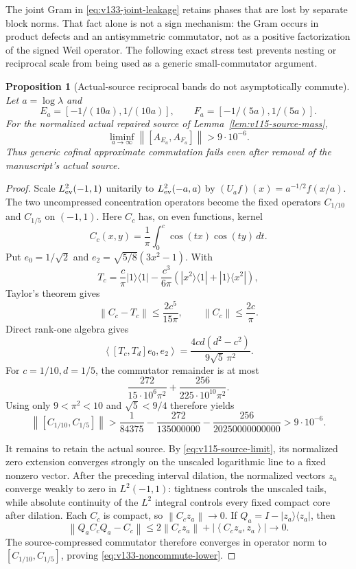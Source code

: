 \documentclass[11pt]{article}
\newtheorem{proposition}[theorem]{Proposition}
\theoremstyle{remark}
\newcommand{\norm}[1]{\left\lVert #1\right\rVert}
\newcommand{\ip}[2]{\left\langle #1,#2\right\rangle}
\begin{document}
The joint Gram in \eqref{eq:v133-joint-leakage} retains phases that are
lost by separate block norms.  That fact alone is not a sign mechanism:
the Gram occurs in product defects and an antisymmetric commutator, not
as a positive factorization of the signed Weil operator.  The following
exact stress test prevents nesting or reciprocal scale from being used
as a generic small-commutator argument.

\begin{proposition}[Actual-source reciprocal bands do not asymptotically commute]
\label{prop:v133-noncommute}
Let $a=\log\lambda$ and
\[
 E_a=[-1/(10a),1/(10a)],\qquad
 F_a=[-1/(5a),1/(5a)].
\]
For the normalized actual repaired source of
Lemma~\ref{lem:v115-source-mass},
\begin{equation}
 \liminf_{a\to\infty}
 \norm{[A_{E_a},A_{F_a}]}>9\cdot10^{-6}.
 \label{eq:v133-noncommute-lower}
\end{equation}
Thus generic cofinal approximate commutation fails even after removal of
the manuscript's actual source.
\end{proposition}
\begin{proof}
Scale $L^2_{\rm ev}(-1,1)$ unitarily to
$L^2_{\rm ev}(-a,a)$ by
$(U_af)(x)=a^{-1/2}f(x/a)$.  The two uncompressed concentration
operators become the fixed operators $C_{1/10}$ and $C_{1/5}$ on
$(-1,1)$.  Here $C_c$ has, on even functions, kernel
\[
 C_c(x,y)=\frac1\pi\int_0^c\cos(tx)\cos(ty)\,dt.
\]
Put $e_0=1/\sqrt2$ and
$e_2=\sqrt{5/8}(3x^2-1)$.  With
\[
 T_c=\frac c\pi|1\rangle\langle1|
 -\frac{c^3}{6\pi}
 (|x^2\rangle\langle1|+|1\rangle\langle x^2|),
\]
Taylor's theorem gives
\[
 \norm{C_c-T_c}\le\frac{2c^5}{15\pi},
 \qquad \norm{C_c}\le\frac{2c}{\pi}.
\]
Direct rank-one algebra gives
\[
 \ip{[T_c,T_d]e_0}{e_2}
 =\frac{4cd(d^2-c^2)}{9\sqrt5\,\pi^2}.
\]
For $c=1/10,d=1/5$, the commutator remainder is at most
\[
 \frac{272}{15\cdot10^6\pi^2}
 +\frac{256}{225\cdot10^{10}\pi^2}.
\]
Using only $9<\pi^2<10$ and $\sqrt5<9/4$ therefore yields
\[
 \norm{[C_{1/10},C_{1/5}]}
 >\frac1{84375}-\frac{272}{135000000}
 -\frac{256}{20250000000000}>9\cdot10^{-6}.
\]

It remains to retain the actual source.  By
\eqref{eq:v115-source-limit}, its normalized zero extension converges
strongly on the unscaled logarithmic line to a fixed nonzero vector.
After the preceding interval dilation, the normalized vectors $z_a$
converge weakly to zero in $L^2(-1,1)$: tightness controls the unscaled
tails, while absolute continuity of the $L^2$ integral controls every
fixed compact core after dilation.  Each $C_c$ is compact, so
$\norm{C_cz_a}\to0$.  If $Q_a=I-|z_a\rangle\langle z_a|$, then
\[
 \norm{Q_aC_cQ_a-C_c}
 \le2\norm{C_cz_a}+|\ip{C_cz_a}{z_a}|\longrightarrow0.
\]
The source-compressed commutator therefore converges in operator norm to
$[C_{1/10},C_{1/5}]$, proving \eqref{eq:v133-noncommute-lower}.
\end{proof}
\end{document}
